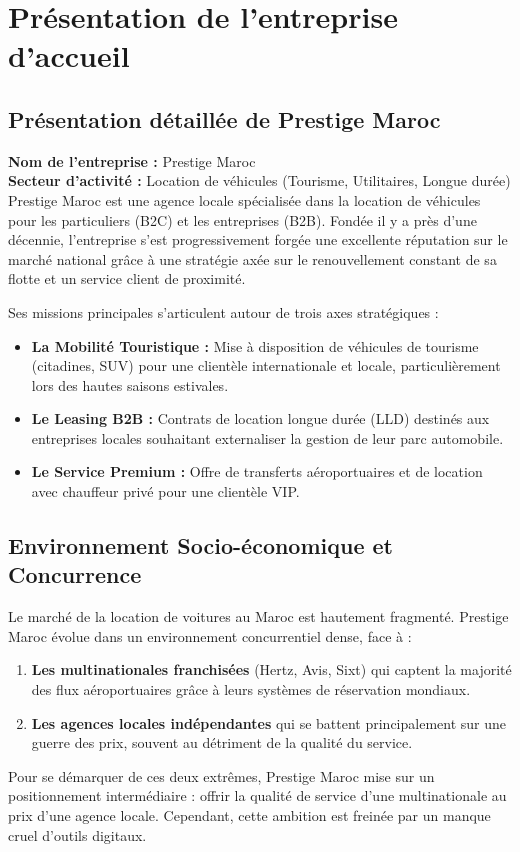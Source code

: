 \chapter{Présentation de l'entreprise d'accueil}

\section{Présentation détaillée de Prestige Maroc}
\textbf{Nom de l'entreprise :} Prestige Maroc \\
\textbf{Secteur d'activité :} Location de véhicules (Tourisme, Utilitaires, Longue durée) \\

Prestige Maroc est une agence locale spécialisée dans la location de véhicules pour les particuliers (B2C) et les entreprises (B2B). Fondée il y a près d'une décennie, l'entreprise s'est progressivement forgée une excellente réputation sur le marché national grâce à une stratégie axée sur le renouvellement constant de sa flotte et un service client de proximité. 

Ses missions principales s'articulent autour de trois axes stratégiques :
\begin{itemize}
    \item \textbf{La Mobilité Touristique :} Mise à disposition de véhicules de tourisme (citadines, SUV) pour une clientèle internationale et locale, particulièrement lors des hautes saisons estivales.
    \item \textbf{Le Leasing B2B :} Contrats de location longue durée (LLD) destinés aux entreprises locales souhaitant externaliser la gestion de leur parc automobile.
    \item \textbf{Le Service Premium :} Offre de transferts aéroportuaires et de location avec chauffeur privé pour une clientèle VIP.
\end{itemize}

\section{Environnement Socio-économique et Concurrence}
Le marché de la location de voitures au Maroc est hautement fragmenté. Prestige Maroc évolue dans un environnement concurrentiel dense, face à :
\begin{enumerate}
    \item \textbf{Les multinationales franchisées} (Hertz, Avis, Sixt) qui captent la majorité des flux aéroportuaires grâce à leurs systèmes de réservation mondiaux.
    \item \textbf{Les agences locales indépendantes} qui se battent principalement sur une guerre des prix, souvent au détriment de la qualité du service.
\end{enumerate}
Pour se démarquer de ces deux extrêmes, Prestige Maroc mise sur un positionnement intermédiaire : offrir la qualité de service d'une multinationale au prix d'une agence locale. Cependant, cette ambition est freinée par un manque cruel d'outils digitaux.

